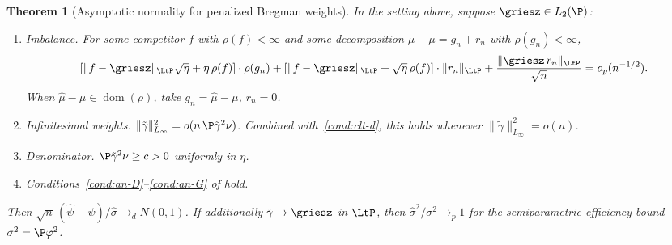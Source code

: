 \documentclass{article}
\newtheorem{theorem}{Theorem}[section]
\begin{document}
\begin{theorem}[Asymptotic normality
  for penalized Bregman weights]
\label{thm:general-clt}
In the setting above,
suppose $\griesz \in L_2(\P)$:
\begin{enumerate}[label=\textup{(\alph*)}]
\item\label{cond:clt-a}
\textit{Imbalance.}
For some competitor $f$ with $\rho(f) < \infty$
and some decomposition
$\hat\mu - \mu = g_n + r_n$
with $\rho(g_n) < \infty$,
\begin{equation}
\label{eq:clt-a}
[\|f - \griesz\|_{\LtP}\sqrt{\eta}
  + \eta\,\rho(f)]
  \cdot \rho(g_n)
  + [\|f - \griesz\|_{\LtP}
  + \sqrt{\eta}\,\rho(f)]
  \cdot \|r_n\|_{\LtP}
  + \frac{\|\griesz\,r_n\|_{\LtP}}{\sqrt{n}}
  = o_p(n^{-1/2}).
\end{equation}
When $\hat\mu - \mu \in \operatorname{dom}(\rho)$,
take $g_n = \hat\mu - \mu$, $r_n = 0$.
\item\label{cond:clt-c}
\textit{Infinitesimal weights.}
$\|\tilde\gamma\|_{L_\infty}^2
  = o(n\,\P\tilde\gamma^2\nu)$.
Combined with~\ref{cond:clt-d},
this holds whenever
$\|\tilde\gamma\|_{L_\infty}^2 = o(n)$.
\item\label{cond:clt-d}
\textit{Denominator.}
$\P\tilde\gamma^2\nu \ge c > 0$
uniformly in $\eta$.
\item\label{cond:clt-e}
Conditions~\ref{cond:an-D}--\ref{cond:an-G}
of 
hold.
\end{enumerate}
Then
$\sqrt{n}\,(\hat\psi - \psi)/\hat\sigma
  \to_d N(0,1)$.
If additionally
$\tilde\gamma \to \griesz$ in $\LtP$,
then $\hat\sigma^2/\sigma^2 \to_p 1$
for the semiparametric efficiency bound
$\sigma^2 = \P\varphi^2$.
\end{theorem}
\end{document}
